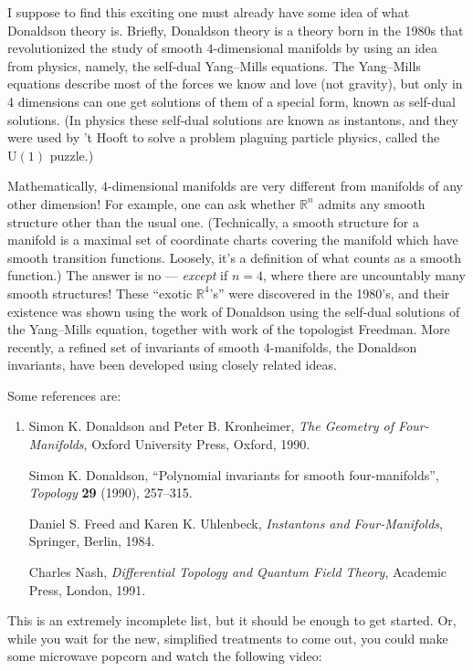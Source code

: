 \documentclass[12pt]{article}
\begin{document}
I suppose to find this exciting one must already have some idea of what
Donaldson theory is. Briefly, Donaldson theory is a theory born in the
1980s that revolutionized the study of smooth \(4\)-dimensional
manifolds by using an idea from physics, namely, the self-dual
Yang--Mills equations. The Yang--Mills equations describe most of the
forces we know and love (not gravity), but only in 4 dimensions can one
get solutions of them of a special form, known as self-dual solutions.
(In physics these self-dual solutions are known as instantons, and they
were used by 't Hooft to solve a problem plaguing particle physics,
called the \(\mathrm{U}(1)\) puzzle.)

Mathematically, \(4\)-dimensional manifolds are very different from
manifolds of any other dimension! For example, one can ask whether
\(\mathbb{R}^n\) admits any smooth structure other than the usual one.
(Technically, a smooth structure for a manifold is a maximal set of
coordinate charts covering the manifold which have smooth transition
functions. Loosely, it's a definition of what counts as a smooth
function.) The answer is no --- \emph{except} if \(n = 4\), where
there are uncountably many smooth structures! These ``exotic
\(\mathbb{R}^4\)'s'' were discovered in the 1980's, and their existence
was shown using the work of Donaldson using the self-dual solutions of
the Yang--Mills equation, together with work of the topologist Freedman.
More recently, a refined set of invariants of smooth 4-manifolds, the
Donaldson invariants, have been developed using closely related ideas.

Some references are:

\begin{enumerate}
\def\labelenumi{\arabic{enumi})}
\item
  Simon K. Donaldson and Peter B. Kronheimer, \emph{The Geometry of Four-Manifolds}, 
  Oxford University Press, Oxford, 1990.

  Simon K.  Donaldson, ``Polynomial invariants for smooth four-manifolds'', 
  \emph{Topology} \textbf{29} (1990), 257--315.

  Daniel S. Freed and Karen K. Uhlenbeck, \emph{Instantons and 
  Four-Manifolds}, Springer, Berlin, 1984.

  Charles Nash, \emph{Differential Topology and Quantum Field Theory}, 
  Academic Press, London, 1991.
\end{enumerate}

This is an extremely incomplete list, but it should be enough to get
started. Or, while you wait for the new, simplified treatments to come
out, you could make some microwave popcorn and watch the following
video:
\end{document}
